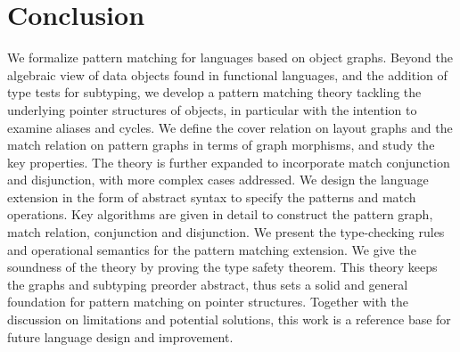\chapter{Conclusion}\label{ch:conclusion}

We formalize pattern matching for {\OO} languages based on object graphs.
Beyond the algebraic view of data objects found in functional languages, and the addition of type tests for {\OO} subtyping,
we develop a pattern matching theory tackling the underlying pointer structures of objects, in particular with the intention to examine aliases and cycles.
We define the cover relation on layout graphs and the match relation on pattern graphs in terms of graph morphisms, and study the key properties.
The theory is further expanded to incorporate match conjunction and disjunction, with more complex cases addressed.
We design the language extension in the form of abstract syntax to specify the patterns and match operations.
Key algorithms are given in detail to construct the pattern graph, match relation, conjunction and disjunction.
We present the type-checking rules and operational semantics for the pattern matching extension.
We give the soundness of the theory by proving the type safety theorem.
This theory keeps the graphs and subtyping preorder abstract, thus sets a solid and general foundation for {\OO} pattern matching on pointer structures.
Together with the discussion on limitations and potential solutions, this work is a reference base for future language design and improvement.

\endinput
